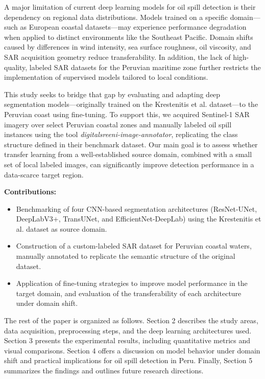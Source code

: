 \documentclass[12pt]{article}
\begin{document}
 A major limitation of current deep learning models for oil spill detection is their dependency on regional data distributions. Models trained on a specific domain—such as European coastal datasets—may experience performance degradation when applied to distinct environments like the Southeast Pacific. Domain shifts caused by differences in wind intensity, sea surface roughness, oil viscosity, and SAR acquisition geometry reduce transferability. In addition, the lack of high-quality, labeled SAR datasets for the Peruvian maritime zone further restricts the implementation of supervised models tailored to local conditions.

This study seeks to bridge that gap by evaluating and adapting deep segmentation models—originally trained on the Krestenitis et al. dataset—to the Peruvian coast using fine-tuning. To support this, we acquired Sentinel-1 SAR imagery over select Peruvian coastal zones and manually labeled oil spill instances using the tool \textit{digitalsreeni-image-annotator}, replicating the class structure defined in their benchmark dataset. Our main goal is to assess whether transfer learning from a well-established source domain, combined with a small set of local labeled images, can significantly improve detection performance in a data-scarce target region.

\textbf{Contributions:}
\begin{itemize}
    \item Benchmarking of four CNN-based segmentation architectures (ResNet-UNet, DeepLabV3+, TransUNet, and EfficientNet-DeepLab) using the Krestenitis et al. dataset as source domain.
    \item Construction of a custom-labeled SAR dataset for Peruvian coastal waters, manually annotated to replicate the semantic structure of the original dataset.
    \item Application of fine-tuning strategies to improve model performance in the target domain, and evaluation of the transferability of each architecture under domain shift.
\end{itemize}

The rest of the paper is organized as follows. Section 2 describes the study areas, data acquisition, preprocessing steps, and the deep learning architectures used. Section 3 presents the experimental results, including quantitative metrics and visual comparisons. Section 4 offers a discussion on model behavior under domain shift and practical implications for oil spill detection in Peru. Finally, Section 5 summarizes the findings and outlines future research directions.
\end{document}
